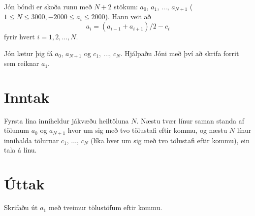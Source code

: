 
Jón bóndi er skoða runu með $N + 2$ stökum:
$a_0$, $a_1$, $\ldots$, $a_{N+1}$ ($1 \leq N
\leq 3000, -2000 \leq a_i \leq 2000$). Hann veit að
\[ a_i = (a_{i-1} + a_{i+1}) / 2 - c_i \]
fyrir hvert $i = 1,2,\ldots,N$.

Jón lætur þig fá
$a_0$, $a_{N+1}$ og $c_1$, $\ldots$, $c_N$.
Hjálpaðu Jóni með því að skrifa forrit sem reiknar $a_1$.

\section*{Inntak}
Fyrsta lína inniheldur jákvæðu heiltöluna $N$. Næstu tvær línur saman
standa af tölunum $a_0$ og $a_{N+1}$ hvor um
sig með tvo tölustafi eftir kommu, og næstu $N$ línur innihalda tölurnar
$c_1$, $\ldots$, $c_N$ (líka hver um sig með tvo tölustafi
eftir kommu), ein tala á línu.

\section*{Úttak}
Skrifaðu út $a_1$ með tveimur tölustöfum eftir kommu.

